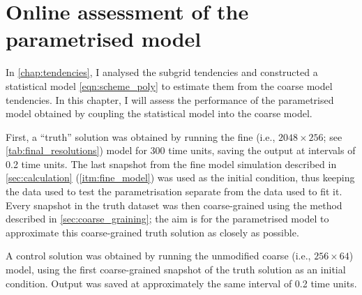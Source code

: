 \documentclass[../main.tex]{subfiles}
\begin{document}
\ifSubfilesClassLoaded{
    \frontmatter
    \tableofcontents
    \mainmatter
}{}

\chapter{Online assessment of the parametrised model} \label{chap:evaluation}
\setlength{\epigraphwidth}{0.5\linewidth}

In \cref{chap:tendencies}, I analysed the subgrid tendencies and
constructed a statistical model \cref{eqn:scheme_poly} to estimate
them from the coarse model tendencies. In this chapter, I will assess
the performance of the parametrised model obtained by coupling the
statistical model into the coarse \rb{} model.

First, a ``truth'' solution was obtained by running the fine (i.e., $2048
\times 256$; see \cref{tab:final_resolutions}) model for 300 time units,
saving the output at intervals of 0.2 time units. The last snapshot from the
fine model simulation described in \cref{sec:calculation}
(\cref{itm:fine_model}) was used as the initial condition, thus keeping
the data used to test the parametrisation separate from the data used to fit
it. Every snapshot in the truth dataset was then coarse-grained using the
method described in \cref{sec:coarse_graining}; the aim is for the
parametrised model to approximate this coarse-grained truth solution as closely
as possible.

A control solution was obtained by running the unmodified coarse (i.e., $256
\times 64$) model, using the first coarse-grained snapshot of the truth
solution as an initial condition. Output was saved at approximately the
same interval of 0.2 time units.
\end{document}

